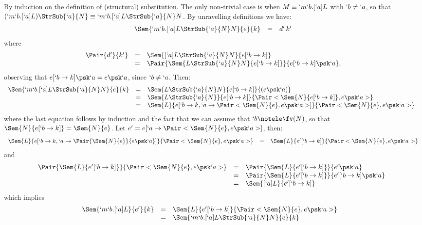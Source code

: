 \documentclass{CSML}
\begin{document}
\proof%
By induction on the definition of (structural) substitution.
The only non-trivial case is when $M \equiv `m `b. [`a]L$ with $`b \neq `a$, so that $(`m `b. [`a]L)\StrSub{`a}{N} \equiv `m`b.[`a]L\StrSub{`a}{N} N$.
By unravelling definitions we have:
%
 \[ \begin{array}{rcl}
 \Sem{ `m`b.[`a]L\StrSub{`a}{N} N }{ e }{ k } 
	&=& 
d'\, k'
 \end{array} \]
where
%
 \[ \begin{array}{rcl}
 \Pair{d' }{ k' } 
	&=& 
 \Sem{ [`a]L\StrSub{`a}{N} N }{ e[`b \to k]} \\
	&=& 
 \Pair{\Sem{ L\StrSub{`a}{N} N }{ e[`b \to k]} }{ e[`b \to k] \psk `a},
 \end{array} \]
observing that $e[`b \to k] \psk `a = e\psk`a$, since $`b \neq `a$. 
Then:
%
 \[ \begin{array}{rcl@{\quad}l}
\Sem{ `m`b.[`a]L\StrSub{`a}{N} N }{ e }{ k } & = & 
\Sem{ L\StrSub{`a}{N} N }{ e[`b \to k] }{ (e\psk `a) } \\ & = & 
\Sem{ L\StrSub{`a}{N} }{ e[`b \to k] }{ \Pair<\Sem{ N }{ e [`b \to k] } , e\psk`a > } \\ & = &
\Sem{ L }{ e[`b \to k, `a \to \Pair<\Sem{ N }{ e } , e\psk`a > ] }{ \Pair<\Sem{ N }{ e } , e\psk`a > }
 \end{array} \]
where the last equation follows by induction and the fact that we can assume that $`b\notele \fv(N)$, so that $\Sem{ N }{ e[`b \to k] } = \Sem{ N }{ e } $. 
Let $e' = e[`a \to \Pair<\Sem{ N }{ e } , e\psk`a >]$, then:
%
 \[ \begin{array}{rcl}
 \Sem{L}{ e[`b \to k, `a \to \Pair{\Sem{ N }{ e } }{ e\psk`a }] }{ \Pair<\Sem{ N }{ e } , e\psk`a > } &=&
 \Sem{ L }{ e'[`b \to k]}{\Pair<\Sem{ N }{ e } , e\psk`a >}
 \end{array} \]
and
%
 \[ \begin{array}{rcl@{\quad}l}
 \Pair{\Sem{L}{ e'[`b \to k] } }{ \Pair<\Sem{ N }{ e } , e\psk`a > } 
	& = & 
\Pair{\Sem{ L }{ e'[`b \to k] } }{ e'\psk `a} 
	\\ & = & 
\Pair{\Sem{ L }{ e'[`b \to k] } }{ e'[`b \to k]\psk `a} 
	\\ & = & 
\Sem{ [`a]L}{e'[`b \to k]}
 \end{array} \]
which implies
 \[ \begin{array}{@{}rcl@{\quad}lc@{}}
 \Sem{ `m `b. [`a]L }{ e' }{ k } 
	&=& 
 \Sem{ L }{ e'[`b \to k] }{ \Pair<\Sem{ N }{ e } , e\psk`a > } \\
	&=& 
 \Sem{ `m`b.[`a]L\StrSub{`a}{N} N }{ e }{ k } 
 \end{array} \]
\arrayqed[-20pt]
\end{document}
